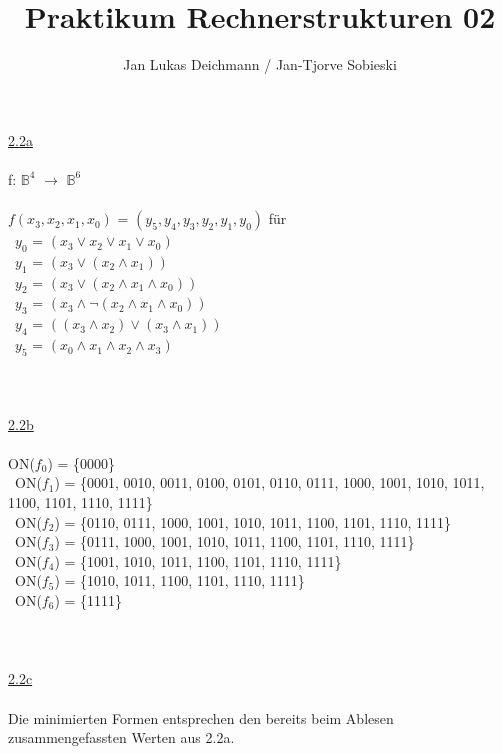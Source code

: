\documentclass[a4paper,10pt]{scrartcl}
\begin{document}
\title{Praktikum Rechnerstrukturen 02}
\author{Jan Lukas Deichmann / Jan-Tjorve Sobieski}
\graphicspath{{images/}}
\maketitle
\noindent
\newpage
\underline{2.2a}\\\\
f: $\mathbb{B}^4$ $\rightarrow$ $\mathbb{B}^6$\\\\
$f(x_{3},x_{2},x_{1},x_{0})$ = $(y_{5},y_{4},y_{3},y_{2},y_{1},y_{0})$ für\\\
$y_{0}$ = $(x_{3} \lor x_{2} \lor x_{1} \lor x_{0})$\\\
$y_{1}$ = $(x_{3} \lor (x_{2} \land x_{1}))$\\\
$y_{2}$ = $(x_{3} \lor (x_{2} \land x_{1} \land x_{0}))$\\\
$y_{3}$ = $(x_{3} \land \lnot(x_{2} \land x_{1} \land x_{0}))$\\\
$y_{4}$ = $((x_{3} \land x_{2}) \lor (x_{3} \land x_{1}))$\\\
$y_{5}$ = $(x_{0} \land x_{1} \land x_{2} \land x_{3})$\\\
\\\\\\
\underline{2.2b}\\\\
ON($f_{0}$) = \{0000\}\\\
ON($f_{1}$) = \{0001, 0010, 0011, 0100, 0101, 0110, 0111, 1000, 1001, 1010, 1011, 1100, 1101, 1110, 1111\}\\\
ON($f_{2}$) = \{0110, 0111, 1000, 1001, 1010, 1011, 1100, 1101, 1110, 1111\}\\\
ON($f_{3}$) = \{0111, 1000, 1001, 1010, 1011, 1100, 1101, 1110, 1111\}\\\
ON($f_{4}$) = \{1001, 1010, 1011, 1100, 1101, 1110, 1111\}\\\
ON($f_{5}$) = \{1010, 1011, 1100, 1101, 1110, 1111\}\\\
ON($f_{6}$) = \{1111\}\\\
\\\\\\
\newpage
\underline{2.2c}\\\\

Die minimierten Formen entsprechen den bereits beim Ablesen zusammengefassten Werten aus 2.2a.\\
\end{document}
